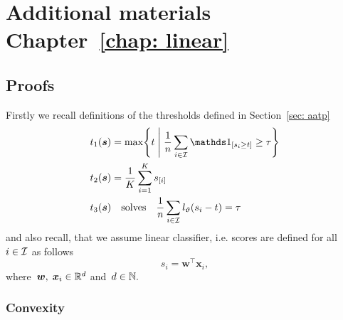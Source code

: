 \chapter{Additional materials Chapter~\ref{chap: linear}}

\section{Proofs}

Firstly we recall definitions of the thresholds defined in Section~\ref{sec: aatp}
\begin{equation*}
  \begin{aligned}
    t_1(\bm{s}) & = \max \Set{t}{\frac{1}{n} \sum_{i \in \I} \Iverson{s_i \ge t} \ge \tau} \\
    t_2(\bm{s}) & = \frac{1}{K} \sum_{i=1}^{K} s_{[i]} \\
    t_3(\bm{s}) & \quad \text{solves} \quad \frac{1}{n} \sum_{i \in \I} l_{\vartheta}(s_i - t) = \tau \\
  \end{aligned}
\end{equation*}
and also recall, that we assume linear classifier, i.e. scores are defined for all~$i \in \mathcal{I}$ as follows
\begin{equation*}
  s_i = \bm{w}^{\top} \bm{x}_i,
\end{equation*}
where~$\bm{w}, \; \bm{x}_i \in \mathbb{R}^d$ and~$d \in \mathbb{N}.$

\subsection{Convexity}

